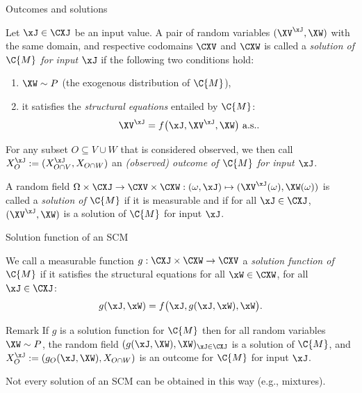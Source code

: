 \begin{frame}{Outcomes and solutions}
\begin{definition}
  Let $\xJ \in \CXJ$ be an input value.
  A pair of random variables $(\XV^{\xJ},\XW)$ with the same domain, and
  respective codomains $\CXV$ and $\CXW$ is called a
  \emph{solution of $\C{M}$ for input $\xJ$} if the following two conditions hold:
    \begin{enumerate}
      \item %
        $\XW \sim P$ (the exogenous distribution of $\C{M}$),
      \item it satisfies the \emph{structural equations} entailed by $\C{M}$:
        $$\XV^{\xJ} = f\big(\xJ, \XV^{\xJ}, \XW\big) \text{ a.s.}.$$
    \end{enumerate}
 
  For any subset $O \subseteq V \cup W$ that is considered observed, we then call
  $X_O^{\xJ} := (X_{O \cap V}^{\xJ},X_{O \cap W})$ an \emph{(observed) outcome of $\C{M}$ for input $\xJ$}.
\end{definition}
\begin{definition}
  A random field 
  $\Omega \times \CXJ \to \CXV \times \CXW : (\omega,\xJ) \mapsto (\XV^{\xJ}(\omega),\XW(\omega))$
  is called a
  \emph{solution of $\C{M}$} if it is measurable and if for all $\xJ\in\CXJ$, $(\XV^{\xJ},\XW)$ is a solution of $\C{M}$ for input $\xJ$.
\end{definition}
\end{frame}

\begin{frame}{Solution function of an SCM}
\begin{definition}
 We call a measurable function
  $g : \CXJ \times \CXW \to \CXV$ a \emph{solution function of $\C{M}$} if it satisfies the structural equations
  for all $\xW\in\CXW$, for all $\xJ\in\CXJ$:
  $$g(\xJ,\xW) = f\big(\xJ, g(\xJ,\xW), \xW\big).$$
\end{definition}
\begin{block}{Remark}
  If $g$ is a solution function for $\C{M}$ then for all random variables $\XW \sim P$,
  the random field $(g(\xJ, \XW), \XW)_{\xJ\in\CXJ}$ is a solution of $\C{M}$,
  and $X_O^{\xJ} := (g_O(\xJ, \XW), X_{O \cap W})$ is an outcome for $\C{M}$ for input $\xJ$.
\end{block}
Not every solution of an SCM can be obtained in this way (e.g., mixtures).
\end{frame}

